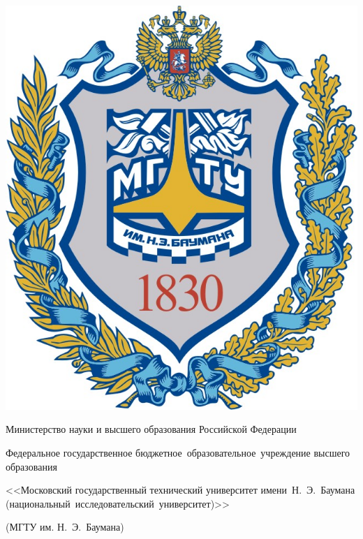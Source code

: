 \begin{titlepage}
	\begin{center}
		\fontsize{12pt}{12pt}\selectfont
		
		\fbox
		{
			\begin{minipage}{0.15\textwidth}
				\includegraphics[width=\linewidth]{./assets/img/bmstu_logo.jpg	}
			\end{minipage}
			\hfill
			
			\vrule
			\hspace{0.2cm}
			
			\begin{minipage}{0.80\textwidth}\centering\bfseries
				{
					\linespread{1}\selectfont
					{Министерство науки и высшего образования Российской Федерации}
					
					{Федеральное государственное бюджетное~образовательное~учреждение высшего образования}
					
					{<<Московский государственный технический университет имени~Н.~Э.~Баумана (национальный~исследовательский~университет)>>}
					
					{(МГТУ им. Н.~Э.~Баумана)}
				}
			\end{minipage}
		}
		

\end{center}
\end{titlepage}
